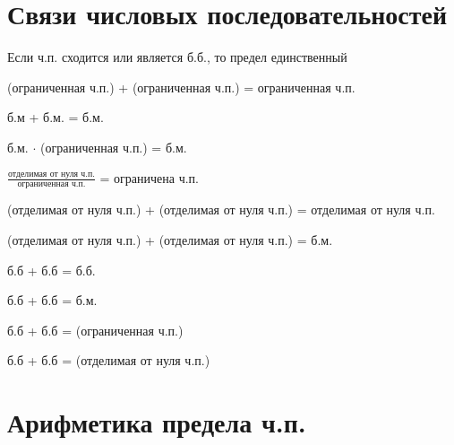 \section{Связи числовых последовательностей}


\nt
{
    Если ч.п. сходится или является б.б., то предел единственный
}

{
    (ограниченная ч.п.) + (ограниченная ч.п.) = ограниченная ч.п.

    б.м + б.м. = б.м.

    б.м. $\cdot$ (ограниченная ч.п.) = б.м.

    $\frac{\text{отделимая от нуля ч.п.}}{\text{ограниченная ч.п.}}$ = ограничена ч.п.
}

{
    (отделимая от нуля ч.п.) + (отделимая от нуля ч.п.) = отделимая от нуля ч.п.

    (отделимая от нуля ч.п.) + (отделимая от нуля ч.п.) = б.м.

    б.б + б.б = б.б.

    б.б + б.б = б.м.

    б.б + б.б = (ограниченная ч.п.)

    б.б + б.б = (отделимая от нуля ч.п.)
}

\section{Арифметика предела ч.п.}


